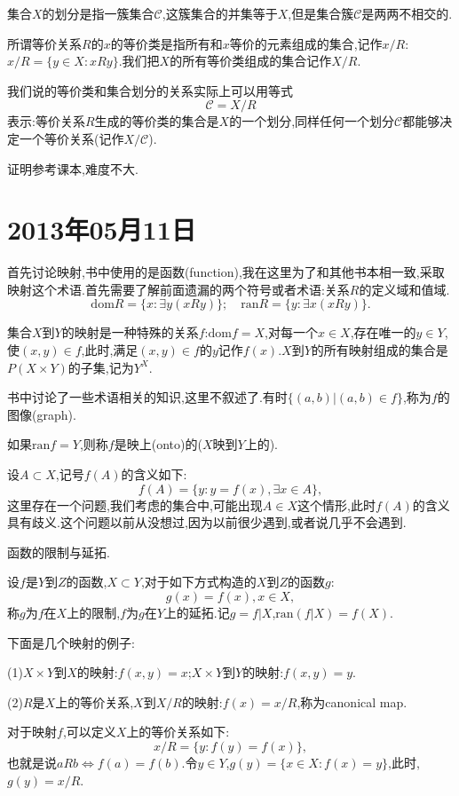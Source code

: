\documentclass[12pt,a4paper,openany]{book}
\begin{document}
集合$X$的划分是指一簇集合$\mathscr{C}$,这簇集合的并集等于$X$,但是集合簇$\mathscr{C}$是两两不相交的.

所谓等价关系$R$的$x$的等价类是指所有和$x$等价的元素组成的集合,记作$x/R$:$x/R=\{y \in X:xRy\}$.我们把$X$的所有等价类组成的集合记作$X/R$.

我们说的等价类和集合划分的关系实际上可以用等式
\[
\mathscr{C} = X/R
\]
表示:等价关系$R$生成的等价类的集合是$X$的一个划分,同样任何一个划分$\mathscr{C}$都能够决定一个等价关系(记作$X/\mathscr{C}$).

证明参考课本,难度不大.

\section{2013年05月11日}
首先讨论映射,书中使用的是函数(function),我在这里为了和其他书本相一致,采取映射这个术语.首先需要了解前面遗漏的两个符号或者术语:关系$R$的定义域和值域.
\[
\text{dom}{R}=\{x: \exists y (xRy)\};\quad \text{ran}{R}=\{y: \exists x(xRy)\}.
\]

集合$X$到$Y$的映射是一种特殊的关系$f$:$\text{dom}{f}=X$,对每一个$x \in X$,存在唯一的$y \in Y$,使$(x,y) \in f$,此时,满足$(x,y) \in f$的$y$记作$f(x)$.$X$到$Y$的所有映射组成的集合是$P(X \times Y)$的子集,记为$Y^X$.

书中讨论了一些术语相关的知识,这里不叙述了.有时$\{(a,b)|(a,b) \in f\}$,称为$f$的图像(graph).

如果$\text{ran}{f}=Y$,则称$f$是映上(onto)的($X$映到$Y$上的).

设$A \subset X$,记号$f(A)$的含义如下:
\[
f(A)=\{y : y=f(x), \exists x \in A\},
\]
这里存在一个问题,我们考虑的集合中,可能出现$A \in X$这个情形,此时$f(A)$的含义具有歧义.这个问题以前从没想过,因为以前很少遇到,或者说几乎不会遇到.

函数的限制与延拓.

设$f$是$Y$到$Z$的函数,$X \subset Y$,对于如下方式构造的$X$到$Z$的函数$g$:
\[
g(x)=f(x),x \in X,
\]
称$g$为$f$在$X$上的限制,$f$为$g$在$Y$上的延拓.记$g=f|X$,$\text{ran}{(f|X)}=f(X)$.

下面是几个映射的例子:

(1)$X \times Y$到$X$的映射:$f(x,y)=x$;$X \times Y$到$Y$的映射:$f(x,y)=y$.

(2)$R$是$X$上的等价关系,$X$到$X/R$的映射:$f(x)=x/R$,称为canonical map.

对于映射$f$,可以定义$X$上的等价关系如下:
\[
x/R=\{y:f(y)=f(x)\},
\]
也就是说$aRb\Leftrightarrow f(a)=f(b)$.令$y \in Y$,$g(y)=\{x \in X:f(x)=y\}$,此时,$g(y)=x/R$.
\end{document}
